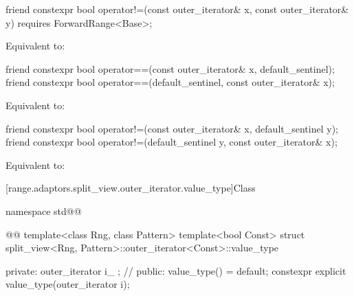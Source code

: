 {%
\begin{itemdecl}
friend constexpr bool operator!=(const outer_iterator& x, const outer_iterator& y)
  requires ForwardRange<Base>;
\end{itemdecl}

\begin{itemdescr}
\pnum
\effects Equivalent to: 
\end{itemdescr}

{\color{newclr}
%
\begin{itemdecl}
friend constexpr bool operator==(const outer_iterator& x, default_sentinel);
friend constexpr bool operator==(default_sentinel, const outer_iterator& x);
\end{itemdecl}

\begin{itemdescr}
\pnum
\effects
Equivalent to: 
\end{itemdescr}

%
\begin{itemdecl}
friend constexpr bool operator!=(const outer_iterator& x, default_sentinel y);
friend constexpr bool operator!=(default_sentinel y, const outer_iterator& x);
\end{itemdecl}

\begin{itemdescr}
\pnum
\effects Equivalent to: 
\end{itemdescr}
} %

[range.adaptors.split_view.outer_iterator.value_type]{Class }

\pnum
\begin{note}
\end{note}

\begin{codeblock}
namespace std@@ { @@
  template<class Rng, class Pattern>
  template<bool Const>
  struct split_view<Rng, Pattern>::outer_iterator<Const>::value_type {
  private:
    outer_iterator i_ {}; // \expos
  public:
    value_type() = default;
    constexpr explicit value_type(outer_iterator i);

}}
\end{codeblock}}
